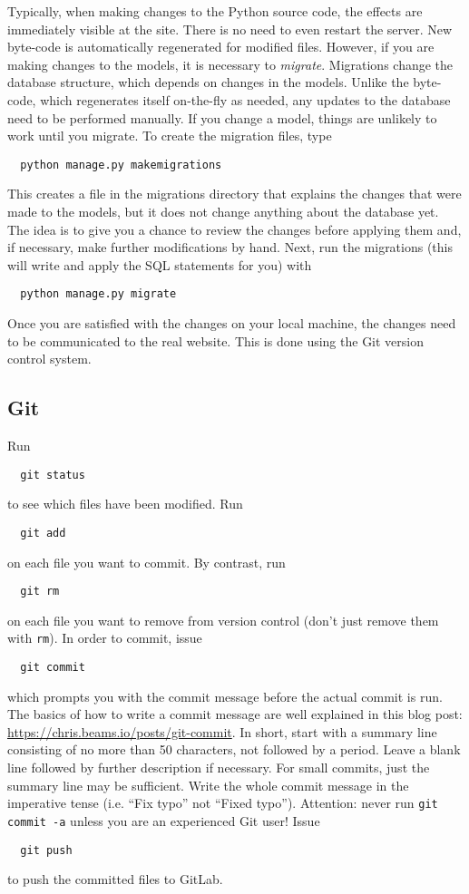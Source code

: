 \documentclass{article}
\begin{document}
Typically, when making changes to the Python source code, the effects are immediately visible at the site. There is no need to even restart the server. New byte-code is automatically regenerated for modified files. However, if you are making changes to the models, it is necessary to \textit{migrate}. Migrations change the database structure, which depends on changes in the models. Unlike the byte-code, which regenerates itself on-the-fly as needed, any updates to the database need to be performed manually. If you change a model, things are unlikely to work until you migrate. To create the migration files, type
\begin{lstlisting}
  python manage.py makemigrations
\end{lstlisting}
This creates a file in the migrations directory that explains the changes that were made to the models, but it does not change anything about the database yet. The idea is to give you a chance to review the changes before applying them and, if necessary, make further modifications by hand. Next, run the migrations (this will write and apply the SQL statements for you) with
\begin{lstlisting}
  python manage.py migrate
\end{lstlisting}

Once you are satisfied with the changes on your local machine, the changes
need to be communicated to the real website. This is done using the Git version control system.

\subsection{Git}

Run
\begin{lstlisting}
  git status
\end{lstlisting}
to see which files have been modified. Run
\begin{lstlisting}
  git add
\end{lstlisting}
on each file you want to commit. By contrast, run
\begin{lstlisting}
  git rm
\end{lstlisting}
on each file you want to remove from version control (don't just remove them with \texttt{rm}).
In order to commit, issue
\begin{lstlisting}
  git commit
\end{lstlisting}
which prompts you with the commit message before the actual commit is run. The basics of how to write a commit message are well explained in this blog post: \url{https://chris.beams.io/posts/git-commit}. In short, start with a summary line consisting of no more than 50 characters, not followed by a period. Leave a blank line followed by further description if necessary. For small commits, just the summary line may be sufficient. Write the whole commit message in the imperative tense (i.e. ``Fix typo'' not ``Fixed typo''). Attention: never run \verb+git commit -a+ unless you are an experienced Git user! Issue
\begin{lstlisting}
  git push
\end{lstlisting}
to push the committed files to GitLab.
\end{document}
